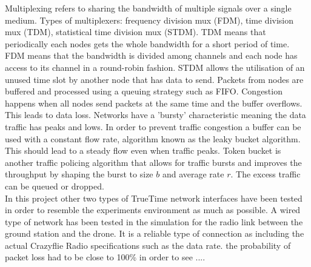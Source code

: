 Multiplexing refers to sharing the bandwidth of multiple signals over a single medium. Types of multiplexers: frequency division mux (FDM), time division mux (TDM), statistical time division mux (STDM). TDM  means that periodically each nodes gets the whole bandwidth for a short period of time. FDM means that the bandwidth is divided among channels and each node has access to its channel in a round-robin fashion. STDM allows the utilisation of an unused time slot by another node that has data to send. Packets from nodes are buffered and processed using a queuing strategy such as FIFO. Congestion happens when all nodes send packets at the same time and the buffer overflows. This leads to data loss. Networks have a 'bursty' characteristic meaning the data traffic has peaks and lows. In order to prevent traffic congestion a buffer can be used with a constant flow rate, algorithm known as the leaky bucket algorithm. This should lead to a steady flow even when traffic peaks. Token bucket is another traffic policing algorithm that  allows for traffic bursts and improves the throughput by shaping the burst to size $b$ and average rate $r$. The excess traffic can be queued or dropped.\\

In this project other two types of TrueTime network interfaces have been tested in order to resemble the experiments environment as much as possible. A wired type of network has been tested in the simulation for the radio link between the ground station and the drone. It is a reliable type of connection as including the actual Crazyflie Radio specifications such as the data rate. the probability of packet loss had to be close to 100\% in order to see ....

